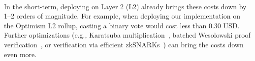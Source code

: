 \hfill\\
In the short-term, deploying on Layer 2 (L2) already brings these costs down by 1--2 orders of magnitude. For example, when deploying our implementation on the Optimism L2 rollup, casting a binary vote would cost less than 0.30 USD.
Further optimizations (e.g., Karatsuba multiplication~\cite{KarOfm62}, batched Wesolowski proof verification~\cite{TCC:Rotem21}, or verification via efficient zkSNARKs~\cite{EC:Groth16,EPRINT:GabWilCio19}) can bring the costs down even more.